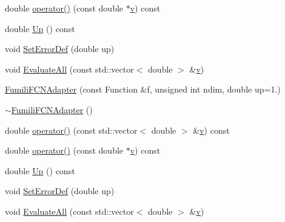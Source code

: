 \begin{DoxyCompactItemize}
\item 
double \mbox{\hyperlink{classROOT_1_1Minuit2_1_1FumiliFCNAdapter_a0e1a10d68960c681ab3e4d5af5c1018b}{operator()}} (const double $\ast$\mbox{\hyperlink{adat__devel_2lib_2hadron_2hadron__timeslice_8cc_a716fc87f5e814be3ceee2405ed6ff22a}{v}}) const
\item 
double \mbox{\hyperlink{classROOT_1_1Minuit2_1_1FumiliFCNAdapter_aeed5b77f0bcca4854a9e6b0620ab3cb9}{Up}} () const
\item 
void \mbox{\hyperlink{classROOT_1_1Minuit2_1_1FumiliFCNAdapter_a4c854e9ce5324ee557f818ecf5f00fb1}{Set\+Error\+Def}} (double up)
\item 
void \mbox{\hyperlink{classROOT_1_1Minuit2_1_1FumiliFCNAdapter_a75bacae09c510900a45ea753afae971a}{Evaluate\+All}} (const std\+::vector$<$ double $>$ \&\mbox{\hyperlink{adat__devel_2lib_2hadron_2hadron__timeslice_8cc_a716fc87f5e814be3ceee2405ed6ff22a}{v}})
\item 
\mbox{\hyperlink{classROOT_1_1Minuit2_1_1FumiliFCNAdapter_a86273eee185e8728ef9bfa5c89bdd621}{Fumili\+F\+C\+N\+Adapter}} (const Function \&f, unsigned int ndim, double up=1.)
\item 
\mbox{\hyperlink{classROOT_1_1Minuit2_1_1FumiliFCNAdapter_ab6c007ce98fb307fc026a52832c39313}{$\sim$\+Fumili\+F\+C\+N\+Adapter}} ()
\item 
double \mbox{\hyperlink{classROOT_1_1Minuit2_1_1FumiliFCNAdapter_a7381e9f93fbec9e0504e3e340c281056}{operator()}} (const std\+::vector$<$ double $>$ \&\mbox{\hyperlink{adat__devel_2lib_2hadron_2hadron__timeslice_8cc_a716fc87f5e814be3ceee2405ed6ff22a}{v}}) const
\item 
double \mbox{\hyperlink{classROOT_1_1Minuit2_1_1FumiliFCNAdapter_a0e1a10d68960c681ab3e4d5af5c1018b}{operator()}} (const double $\ast$\mbox{\hyperlink{adat__devel_2lib_2hadron_2hadron__timeslice_8cc_a716fc87f5e814be3ceee2405ed6ff22a}{v}}) const
\item 
double \mbox{\hyperlink{classROOT_1_1Minuit2_1_1FumiliFCNAdapter_aeed5b77f0bcca4854a9e6b0620ab3cb9}{Up}} () const
\item 
void \mbox{\hyperlink{classROOT_1_1Minuit2_1_1FumiliFCNAdapter_a4c854e9ce5324ee557f818ecf5f00fb1}{Set\+Error\+Def}} (double up)
\item 
void \mbox{\hyperlink{classROOT_1_1Minuit2_1_1FumiliFCNAdapter_a75bacae09c510900a45ea753afae971a}{Evaluate\+All}} (const std\+::vector$<$ double $>$ \&\mbox{\hyperlink{adat__devel_2lib_2hadron_2hadron__timeslice_8cc_a716fc87f5e814be3ceee2405ed6ff22a}{v}})
\end{DoxyCompactItemize}
